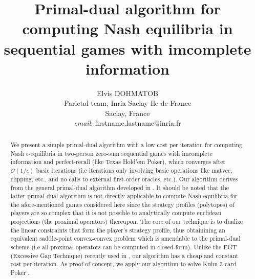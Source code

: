 \documentclass[12pt]{article}
\author{
Elvis DOHMATOB
\\
Parietal team, Inria Saclay Ile-de-France\\
Saclay, France\\
\textit{email}: firstname.lastname@inria.fr}
\title{\bf Primal-dual algorithm for computing Nash equilibria in
sequential games with imcomplete information
}
\begin{document}
\maketitle

\begin{abstract}
We present a simple primal-dual algorithm with a low cost per iteration for computing Nash $\epsilon$-equilibria in two-person zero-sum sequential games with imcomplete information and perfect-recall (like Texas Hold'em Poker), which converges after $\mathcal{O}(1/\epsilon)$ basic iterations (i.e iterations only involving basic operations like matvec, clipping, etc., and no calls to external first-order oracles, etc.). %
Our algorithm derives from the general primal-dual algorithm developed
in \cite{chambolle2010, chambolle2014ergodic}. It should be noted that the latter primal-dual algorithm is not directly applicable to compute Nash equilibria for the afore-mentioned games considered here since the strategy profiles (polytopes) of players are so complex that it is not possible
 to analytically compute
euclidean
 projections (the proximal operators) thereupon.
The core of our technique is to dualize the linear constraints that form the player's strategy profile, thus obtainining an equivalent saddle-point convex-convex problem which is amendable to the primal-dual scheme (i.e all proximal operators can be computed in closed-form). Unlike the EGT (Excessive Gap Technique) recently used in \cite{hoda2010smoothing, gilpinfirst}, our algorithm has a cheap and constant cost per iteration. As proof of concept, we apply our algorithm to solve Kuhn 3-card Poker \cite{kuhn}.
\end{abstract}
\end{document}
